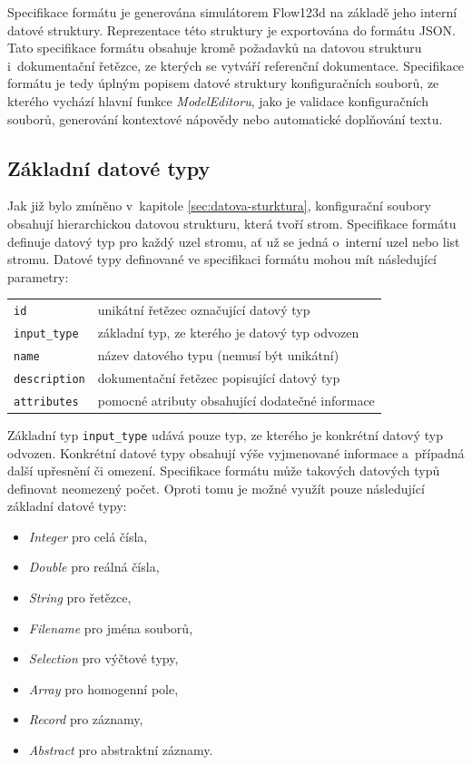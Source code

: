 \documentclass[FM,bw,DP]{tulthesis}
\begin{document}
Specifikace formátu je generována simulátorem Flow123d na základě jeho interní datové struktury. Reprezentace této struktury je exportována do formátu \gls{JSON}. Tato specifikace formátu obsahuje kromě požadavků na datovou strukturu i~dokumentační řetězce, ze kterých se vytváří referenční dokumentace. Specifikace formátu je tedy úplným popisem datové struktury konfiguračních souborů, ze kterého vychází hlavní funkce \textit{ModelEditoru}, jako je validace konfiguračních souborů, generování kontextové nápovědy nebo automatické doplňování textu.

\subsection{Základní datové typy}
\label{sec:analyza-specifikace-formatu-zakladni-datove-typy}
Jak již bylo zmíněno v~kapitole \ref{sec:datova-sturktura}, konfigurační soubory obsahují hierarchickou datovou strukturu, která tvoří strom. Specifikace formátu definuje datový typ pro každý uzel stromu, ať už se jedná o~interní uzel nebo list stromu. Datové typy definované ve specifikaci formátu mohou mít následující parametry:


\vspace{0.5cm}
\begin{tabular}{m{3cm}@{}l}
\texttt{id}\dotfill & unikátní řetězec označující datový typ \\
\texttt{input\_type}\dotfill & základní typ, ze kterého je datový typ odvozen  \\
\texttt{name}\dotfill & název datového typu (nemusí být unikátní) \\
\texttt{description}\dotfill & dokumentační řetězec popisující datový typ \\
\texttt{attributes}\dotfill & pomocné atributy obsahující dodatečné informace \\
\end{tabular}
\vspace{0.5cm}

Základní typ \texttt{input\_type} udává pouze typ, ze kterého je konkrétní datový typ odvozen. Konkrétní datové typy obsahují výše vyjmenované informace a~případná další upřesnění či omezení. Specifikace formátu může takových datových typů definovat neomezený počet. Oproti tomu je možné využít pouze následující základní datové typy:

\begin{itemize}[itemsep=2pt, topsep=12pt, partopsep=0pt]
\item \textit{Integer} pro celá čísla,
\item \textit{Double} pro reálná čísla,
\item \textit{String} pro řetězce,
\item \textit{Filename} pro jména souborů,
\item \textit{Selection} pro výčtové typy,
\item \textit{Array} pro homogenní pole,
\item \textit{Record} pro záznamy,
\item \textit{Abstract} pro abstraktní záznamy.
\end{itemize}
\end{document}
